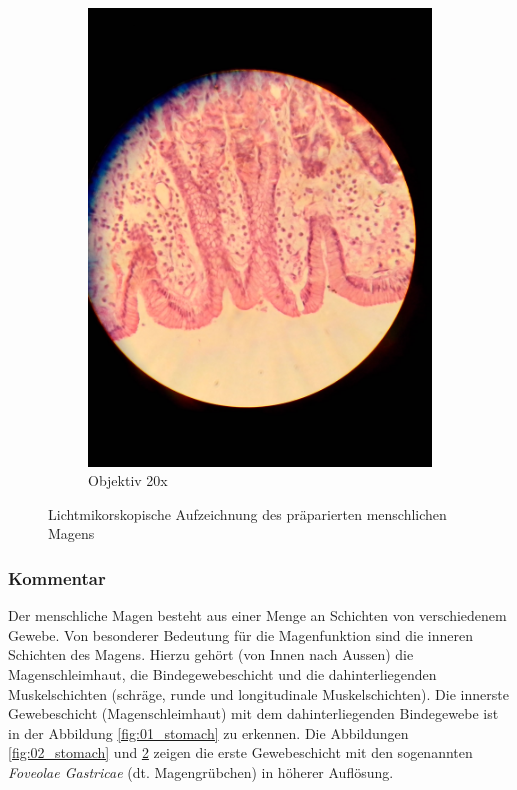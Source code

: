 \begin{figure}[h!]
\begin{subfigure}[b]{0.3\textwidth}
		\includegraphics[width=1\textwidth]{../images/03_stomach.jpg}
		\caption{Objektiv 20x}
		\label{fig:03_stomach}
	\end{subfigure}
	\caption{Lichtmikorskopische Aufzeichnung des präparierten
		menschlichen Magens}
\end{figure}

\subsubsection{Kommentar}
Der menschliche Magen besteht aus einer Menge an Schichten von verschiedenem
Gewebe. Von besonderer Bedeutung für die Magenfunktion sind die inneren
Schichten des Magens. Hierzu gehört (von Innen nach Aussen) die
Magenschleimhaut, die Bindegewebeschicht und die dahinterliegenden
Muskelschichten (schräge, runde und longitudinale Muskelschichten).
Die innerste Gewebeschicht (Magenschleimhaut) mit dem dahinterliegenden
Bindegewebe ist in der Abbildung \ref{fig:01_stomach} zu erkennen. Die
Abbildungen \ref{fig:02_stomach} und \ref{fig:03_stomach} zeigen die erste
Gewebeschicht mit den sogenannten \textit{Foveolae Gastricae} (dt.
Magengrübchen) in höherer Auflösung.

